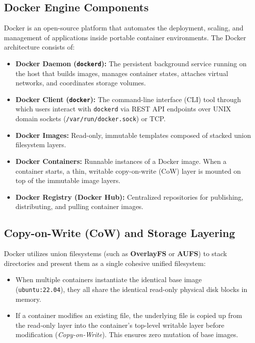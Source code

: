 \documentclass[11pt,a4paper,openany]{report}
\begin{document}
\subsection{Docker Engine Components}
Docker is an open-source platform that automates the deployment, scaling, and management of applications inside portable container environments. The Docker architecture consists of:
\begin{itemize}[leftmargin=*]
  \item \textbf{Docker Daemon (\texttt{dockerd}):} The persistent background service running on the host that builds images, manages container states, attaches virtual networks, and coordinates storage volumes.
  \item \textbf{Docker Client (\texttt{docker}):} The command-line interface (CLI) tool through which users interact with \texttt{dockerd} via REST API endpoints over UNIX domain sockets (\texttt{/var/run/docker.sock}) or TCP.
  \item \textbf{Docker Images:} Read-only, immutable templates composed of stacked union filesystem layers.
  \item \textbf{Docker Containers:} Runnable instances of a Docker image. When a container starts, a thin, writable copy-on-write (CoW) layer is mounted on top of the immutable image layers.
  \item \textbf{Docker Registry (Docker Hub):} Centralized repositories for publishing, distributing, and pulling container images.
\end{itemize}

\subsection{Copy-on-Write (CoW) and Storage Layering}
Docker utilizes union filesystems (such as \textbf{OverlayFS} or \textbf{AUFS}) to stack directories and present them as a single cohesive unified filesystem:
\begin{itemize}[leftmargin=*]
  \item When multiple containers instantiate the identical base image (\texttt{ubuntu:22.04}), they all share the identical read-only physical disk blocks in memory.
  \item If a container modifies an existing file, the underlying file is copied up from the read-only layer into the container's top-level writable layer before modification (\emph{Copy-on-Write}). This ensures zero mutation of base images.
\end{itemize}
\end{document}
